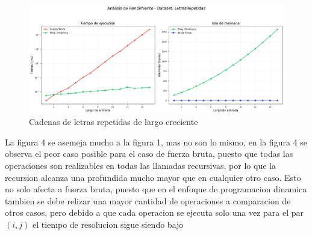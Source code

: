 \begin{figure}[H]
    \centering
        \includegraphics[width=\textwidth]{images/LetrasRepetidas_analisis.png}
    \caption{Cadenas de letras repetidas de largo creciente}
    \label{fig:scatterplot_4}
\end{figure}
La figura 4 se asemeja mucho a la figura 1, mas no son lo mismo, en la figura 4 se observa el peor caso posible para el caso de fuerza bruta, puesto
que todas las operaciones son realizables en todas las llamadas recursivas, por lo que la recursion alcanza una profundida mucho mayor que en cualquier otro
caso. Esto no solo afecta a fuerza bruta, puesto que en el enfoque de programacion dinamica tambien se debe relizar una mayor cantidad de operaciones a comparacion
de otros casos, pero debido a que cada operacion se ejecuta solo una vez para el par $(i,j)$ el tiempo de resolucion sigue siendo bajo

